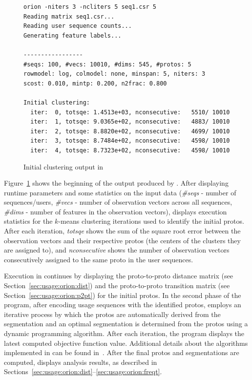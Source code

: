 \documentclass[]{article}
\begin{document}
\begin{figure}[h] 
\small
\begin{Verbatim}[frame=single]
orion -niters 3 -ncliters 5 seq1.csr 5 
Reading matrix seq1.csr...
Reading user sequence counts...
Generating feature labels...

-----------------
#seqs: 100, #vecs: 10010, #dims: 545, #protos: 5
rowmodel: log, colmodel: none, minspan: 5, niters: 3
scost: 0.010, mintp: 0.200, n2frac: 0.800

Initial clustering:
  iter:  0, totsqe: 1.4513e+03, nconsecutive:   5510/ 10010
  iter:  1, totsqe: 9.0365e+02, nconsecutive:   4883/ 10010
  iter:  2, totsqe: 8.8820e+02, nconsecutive:   4699/ 10010
  iter:  3, totsqe: 8.7484e+02, nconsecutive:   4598/ 10010
  iter:  4, totsqe: 8.7323e+02, nconsecutive:   4598/ 10010
\end{Verbatim}
\caption{Initial clustering output in \orionp}
\label{fig:verb:initclust}
\end{figure}

Figure~\ref{fig:verb:initclust} shows the beginning of the output produced by
\orionp. After displaying runtime parameters and some statistics on the input
data (\emph{\#seqs} - number of sequences/users, \emph{\#vecs} - number of
observation vectors across all sequences, \emph{\#dims} - number of features in
the observation vectors), \orionp displays execution statistics for the
$k$-means clustering iterations used to identify the initial protos. After each
iteration, \emph{totsqe} shows the sum of the square root error between the
observation vectors and their respective protos (the centers of the clusters
they are assigned to), and \emph{nconsecutive} shows the number of observation
vectors consecutively assigned to the same proto in the user sequences.

Execution in \orionp continues by displaying the proto-to-proto distance matrix
(see Section~\ref{sec:usage:orion:dist}) and the proto-to-proto transition
matrix (see Section~\ref{sec:usage:orion:p2pt}) for the initial protos. In the
second phase of the program, after encoding usage sequences with the identified
protos, \orionp employs an iterative process by which the protos are
automatically derived from the segmentation and an optimal segmentation is
determined from the protos using a dynamic programming algorithm. After each
iteration, the program displays the latest computed objective function value.
Additional details about the algorithms implemented in \orionp can be found
in~\cite{AnastasiuRTK15}. After the final protos and segmentations are computed,
\orionp displays analysis results, as described in
Sections~\ref{sec:usage:orion:dist}--\ref{sec:usage:orion:freqt}.
\end{document}

